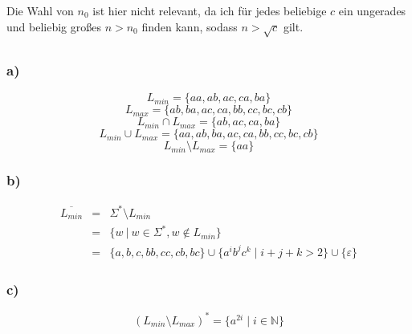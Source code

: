 \documentclass{article}
\begin{document}
   Die Wahl von $n_0$ ist hier nicht relevant, da ich f\"ur jedes beliebige $c$
   ein ungerades und beliebig gro\ss{}es $n > n_0$ finden kann, sodass $n >
   \sqrt{c}$ gilt.

   \subsection{} 

   \subsubsection{a)}

   \begin{equation*}
      L_{min} = \{aa, ab, ac, ca, ba\}
   \end{equation*}
   \begin{equation*}
      L_{max} = \{ab, ba, ac, ca, bb, cc, bc, cb\}
   \end{equation*}
   \begin{equation*}
      L_{min} \cap L_{max} = \{ab, ac, ca, ba\}
   \end{equation*}
   \begin{equation*}
      L_{min} \cup L_{max} = \{aa, ab, ba, ac, ca, bb, cc, bc, cb\}
   \end{equation*}
   \begin{equation*}
      L_{min} \setminus L_{max} = \{aa\}
   \end{equation*}
   \subsubsection{b)}

   \begin{eqnarray*}
      \overline{L_{min}} & = &  \Sigma^* \setminus L_{min} \\
                         & = & \{w~ |~ w \in \Sigma^*, w \not\in L_{min}\} \\
                         & = & \{a, b, c, bb, cc, cb, bc\} \cup \{a^ib^jc^k \mid
   i+j+k > 2\} \cup \{\varepsilon\}
   \end{eqnarray*}
   \subsubsection{c)}
   
   \begin{equation*}
      \left(L_{min}\setminus L_{max}\right)^* = \{a^{2i} \mid i \in
      \mathbb{N}\}
   \end{equation*}
\end{document}
